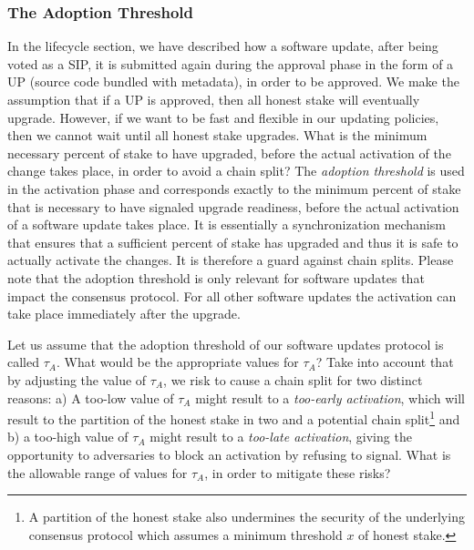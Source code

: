 
\subsubsection{The Adoption Threshold}
In the lifecycle section, we have described how a software update, after being voted as a SIP, it is submitted again during the approval phase in the form of a UP (source code bundled with metadata), in order to be approved. We make the assumption that if a UP is approved, then all honest stake will eventually upgrade. However, if we want to be fast and flexible in our updating policies, then we cannot wait until all honest stake upgrades. What is the minimum necessary percent of stake to have upgraded, before the actual activation of the change takes place, in order to avoid a chain split? The \emph{adoption threshold} is used in the activation phase and corresponds exactly to the minimum percent of stake that is necessary to have signaled upgrade readiness, before the actual activation of a software update takes place. It is essentially a synchronization mechanism that ensures that a sufficient percent of stake has upgraded and thus it is safe to actually activate the changes. It is therefore a guard against chain splits. Please note that the adoption threshold is only relevant for software updates that impact the consensus protocol. For all other software updates the activation can take place immediately after the upgrade.

Let us assume that the adoption threshold of our software updates protocol is called $\tau_A$. %
What would be the appropriate values for $\tau_A$? Take into account that by adjusting the value of $\tau_A$, we risk to cause a chain split for two distinct reasons: a) A too-low value of $\tau_A$ might result to a \emph{too-early activation}, which will result to the partition of the honest stake in two and a potential chain split\footnote{A partition of the honest stake also undermines the security of the underlying consensus protocol which assumes a minimum threshold $x$ of honest stake.}  and b) a too-high value of $\tau_A$ might result to a \emph{too-late activation}, giving the opportunity to adversaries to block an activation by refusing to signal. %
What is the allowable range of values for $\tau_A$, in order to mitigate these risks?

